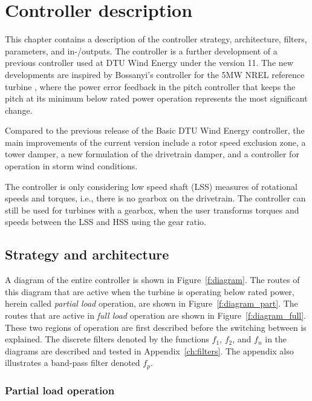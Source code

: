 \chapter{Controller description} 
\label{cha:description}

This chapter contains a description of the controller strategy, architecture, filters, parameters, and in-/outputs. The controller is a further development of a previous controller used at DTU Wind Energy under the version 11. The new developments are inspired by Bossanyi's controller for the 5MW NREL reference turbine \cite{Bossanyi09}, where the power error feedback in the pitch controller that keeps the pitch at its minimum below rated power operation represents the most significant change.

Compared to the previous release of the Basic DTU Wind Energy controller, the main improvements of the current version include a rotor speed exclusion zone, a tower damper, a new formulation of the drivetrain damper, and a controller for operation in storm wind conditions. 

The controller is only considering low speed shaft (LSS) measures of rotational speeds and torques, i.e., there is no gearbox on the drivetrain. The controller can still be used for turbines with a gearbox, when the user transforms torques and speeds between the LSS and HSS using the gear ratio.

\section{Strategy and architecture}

A diagram of the entire controller is shown in Figure~\ref{f:diagram}. The routes of this diagram that are active when the turbine is operating below rated power, herein called \emph{partial load} operation, are shown in Figure~\ref{f:diagram_part}. The routes that are active in \emph{full load} operation are shown in Figure~\ref{f:diagram_full}. These two regions of operation are first described before the switching between is explained. The discrete filters denoted by the functions $f_1$, $f_2$, and $f_n$ in the diagrams are described and tested in Appendix~\ref{ch:filters}. The appendix also illustrates a band-pass filter denoted $f_p$.

\subsection{Partial load operation}

